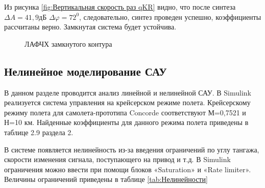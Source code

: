 Из рисунка \ref{fig:Вертикальная скорость раз qKR} видно, что после синтеза $\Delta A = 41,9 $дБ $\Delta \varphi = 72^0$, следовательно, синтез проведен успешно, коэффициенты рассчитаны верно. Замкнутая система будет устойчива.  

\begin{figure}[H]
    \caption{ЛАФЧХ замкнутого контура }
    \label{fig:Вертикальная скорость зам qKR}
\end{figure}

\subsection{Нелинейное моделирование САУ}

В данном разделе проводится анализ линейной и нелинейной САУ. В Simulink реализуется система управления на крейсерском режиме полета. Крейсерскому режиму полета для самолета-прототипа Concorde соответствуют М=0,7521 и Н=10 км. Найденные коэффициенты для данного режима полета приведены в таблице 2.9 раздела 2. 

В системе появляется нелинейность из-за введения ограничений по углу тангажа, скорости изменения сигнала, поступающего на привод и т.д. В Simulink ограничения можно ввести при помощи блоков «Saturation» и «Rate limiter». Величины ограничений приведены в таблице \ref{tab:Нелинейности}

